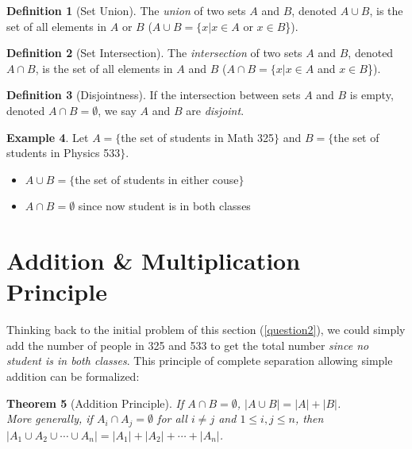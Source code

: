 \documentclass[openany]{book}
\newtheorem{thm}{Theorem}[section]
\theoremstyle{definition}
\newtheorem{definition}[thm]{Definition}
\newtheorem{example}[thm]{Example}
\begin{document}
\begin{definition}[Set Union]\hfill

    The \emph{union} of two sets $A$ and $B$, denoted $A\cup B$, is the set of all elements in $A$ or $B$ ($A\cup B=\{x|x\in A$ or $x\in B$\}).
\end{definition}
\begin{definition}[Set Intersection]\hfill

    The \emph{intersection} of two sets $A$ and $B$, denoted $A\cap B$, is the set of all elements in $A$ and $B$ ($A\cap B=\{x|x\in A$ and $x\in B$\}).
\end{definition}
\begin{definition}[Disjointness]\hfill

    If the intersection between sets $A$ and $B$ is empty, denoted $A\cap B=\emptyset$, we say $A$ and $B$ are \emph{disjoint}.
\end{definition}
\begin{example}\hfill

Let $A=\{$the set of students in Math 325$\}$ and $B=\{$the set of students in Physics 533$\}$.
\begin{itemize}
    \item $A\cup B=\{$the set of students in either couse$\}$
    \item $A\cap B=\emptyset$ since now student is in both classes
\end{itemize}
\end{example}

\section{Addition \& Multiplication Principle}
Thinking back to the initial problem of this section (\ref{question2}), we could simply add the number of people in 325 and 533 to get the total number \emph{since no student is in both classes}. This principle of complete separation allowing simple addition can be formalized: 
\begin{thm}[Addition Principle]\hfill

    If $A\cap B=\emptyset$, $|A\cup B|=|A|+|B|$.\\
    More generally, if $A_i\cap A_j=\emptyset$ for all $i\neq j$ and $1\leq i,j\leq n$, then $|A_1\cup A_2\cup \cdots \cup A_n|=|A_1|+|A_2|+\cdots +|A_n|$.
\end{thm}
\end{document}
